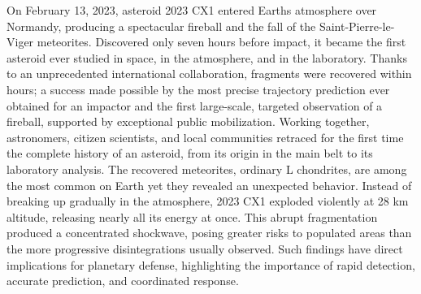 On February 13, 2023, asteroid 2023 CX1 entered Earths atmosphere over Normandy, producing a spectacular fireball and the fall of the Saint-Pierre-le-Viger meteorites. Discovered only seven hours before impact, it became the first asteroid ever studied in space, in the atmosphere, and in the laboratory. Thanks to an unprecedented international collaboration, fragments were recovered within hours; a success made possible by the most precise trajectory prediction ever obtained for an impactor and the first large-scale, targeted observation of a fireball, supported by exceptional public mobilization. Working together, astronomers, citizen scientists, and local communities retraced for the first time the complete history of an asteroid, from its origin in the main belt to its laboratory analysis. The recovered meteorites, ordinary L chondrites, are among the most common on Earth yet they revealed an unexpected behavior. Instead of breaking up gradually in the atmosphere, 2023 CX1 exploded violently at 28 km altitude, releasing nearly all its energy at once. This abrupt fragmentation produced a concentrated shockwave, posing greater risks to populated areas than the more progressive disintegrations usually observed. Such findings have direct implications for planetary defense, highlighting the importance of rapid detection, accurate prediction, and coordinated response.
